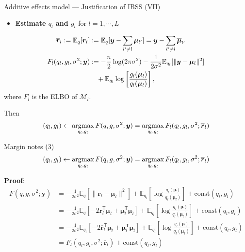 \documentclass[10pt]{beamer}
\begin{document}
\begin{frame}{Additive effects model --- \normalsize Justification of IBSS (VII)}
    \begin{itemize}
        \item \textbf{Estimate $q_l$ and $g_l$} for $l=1,\cdots,L$
    \end{itemize}
    
    \begin{align}
        \overline{\bm{r}}_l := \mathbb{E}_q[\bm{r}_l] 
        & := \mathbb{E}_q[\bm{y}-\sum_{l'\neq l}\bm{\mu}_{l'}] = \bm{y} - \sum_{l'\neq l}\overline{\bm{\mu}}_{l'} \\
        F_l(q_l,g_l,\sigma^2;\bm{y}) 
        & := -\frac{n}{2}\log(2\pi\sigma^2) - \frac{1}{2\sigma^2}\mathbb{E}_{q_l}[\|\bm{y}-\bm{\mu}_l\|^2] \notag\\
        & ~~~ + \mathbb{E}_{q_l}\log\left[\frac{g_l(\bm{\mu}_l)}{q_l(\bm{\mu}_l)}\right],
    \end{align}
    where $F_l$ is the ELBO of $\mathcal{M}_l$.

    \medskip
    
    Then
    \begin{gather}
        (q_l,g_l) \gets \operatorname*{\arg\!max}_{q_l,g_l} F(q,g,\sigma^2;\bm{y}) = \operatorname*{\arg\!max}_{q_l,g_l} F_l(q_l,g_l,\sigma^2;\overline{\bm{r}}_l)
    \end{gather}
\end{frame}







\begin{frame}{Margin notes (3)}
    \begin{gather}
        (q_l,g_l) \gets \operatorname*{\arg\!max}_{q_l,g_l} F(q,g,\sigma^2;\bm{y}) = \operatorname*{\arg\!max}_{q_l,g_l} F_l(q_l,g_l,\sigma^2;\overline{\bm{r}}_l)
    \end{gather}
    
    \medskip
    
    \textbf{Proof}:
    {\footnotesize
    \begin{align}
        F(q,g,\sigma^2;\bm{y}) 
        & = -\frac{1}{2\sigma^2}\mathbb{E}_q[\|\bm{r}_l-\bm{\mu}_l\|^2] 
        + \mathbb{E}_{q_l}\left[\log\frac{g_l(\bm{\mu})}{q_l(\bm{\mu}_l)}\right] 
        + \text{const}(q_l,g_l) \\
        & = -\frac{1}{2\sigma^2}\mathbb{E}_q[-2\bm{r}_l^\mathsf{T}\bm{\mu}_l + \bm{\mu}_l^\mathsf{T}\bm{\mu}_l] 
        + \mathbb{E}_{q_l}\left[\log\frac{g_l(\bm{\mu})}{q_l(\bm{\mu}_l)}\right] 
        + \text{const}(q_l,g_l) \\
        & = -\frac{1}{2\sigma^2}\mathbb{E}_{q_l}[-2\overline{\bm{r}}_l^\mathsf{T}\bm{\mu}_l + \bm{\mu}_l^\mathsf{T}\bm{\mu}_l] 
        + \mathbb{E}_{q_l}\left[\log\frac{g_l(\bm{\mu})}{q_l(\bm{\mu}_l)}\right] 
        + \text{const}(q_l,g_l) \\
        & = F_l(q_l,g_l,\sigma^2;\overline{\bm{r}}_l) + \text{const}(q_l,g_l)
    \end{align}}
\end{frame}
\end{document}
